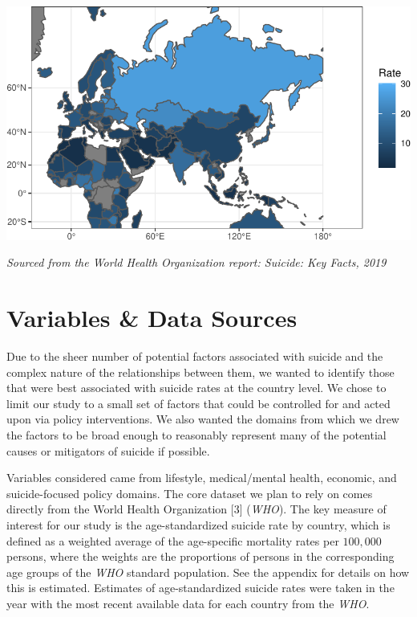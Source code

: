\documentclass[]{article}
\begin{document}
\begin{center}\includegraphics{Project_Report_files/figure-latex/russia_map_plot-1} \end{center}

\emph{Sourced from the World Health Organization report: Suicide: Key
Facts, 2019}

\newpage 

\section{Variables \& Data Sources}\label{variables-data-sources}

Due to the sheer number of potential factors associated with suicide and
the complex nature of the relationships between them, we wanted to
identify those that were best associated with suicide rates at the
country level. We chose to limit our study to a small set of factors
that could be controlled for and acted upon via policy interventions. We
also wanted the domains from which we drew the factors to be broad
enough to reasonably represent many of the potential causes or
mitigators of suicide if possible.

Variables considered came from lifestyle, medical/mental health,
economic, and suicide-focused policy domains. The core dataset we plan
to rely on comes directly from the World Health Organization {[}3{]}
(\emph{WHO}). The key measure of interest for our study is the
age-standardized suicide rate by country, which is defined as a weighted
average of the age-specific mortality rates per \(100,000\) persons,
where the weights are the proportions of persons in the corresponding
age groups of the \emph{WHO} standard population. See the appendix for
details on how this is estimated. Estimates of age-standardized suicide
rates were taken in the year with the most recent available data for
each country from the \emph{WHO}.
\end{document}
